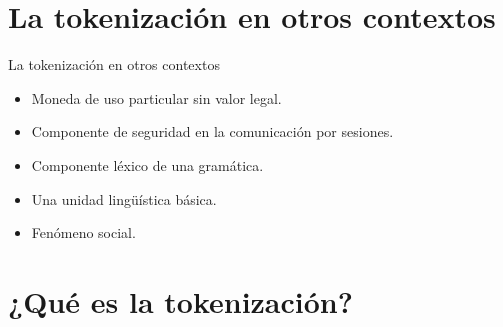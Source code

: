 \documentclass{beamer}
\begin{document}
  \section{La tokenización en otros contextos}

  \begin{frame}{La tokenización en otros contextos}
    \begin{itemize}
      \item Moneda de uso particular sin valor legal.
      \item Componente de seguridad en la comunicación por sesiones.
      \item Componente léxico de una gramática.
      \item Una unidad lingüística básica.
      \item Fenómeno social.
    \end{itemize}
  \end{frame}

  \section{¿Qué es la tokenización?}
\end{document}
